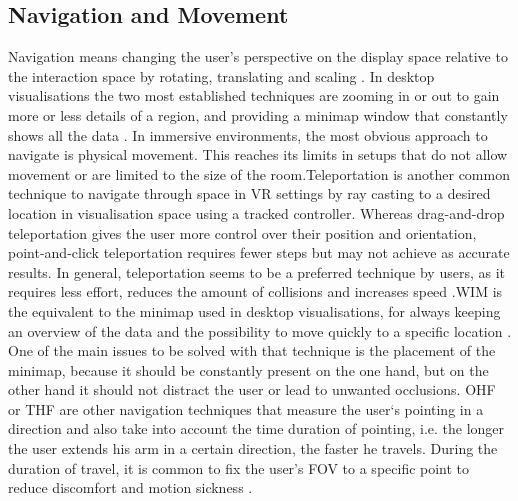 \subsection{Navigation and Movement}
\label{subsection:Navigation}
Navigation means changing the user's perspective on the display space relative to the interaction space by rotating, translating and scaling \autocite[48]{Cordeil2017}. In desktop visualisations the two most established techniques are zooming in or out to gain more or less details of a region, and providing a minimap window that constantly shows all the data \autocite[1214]{Yang2021}. In immersive environments, the most obvious approach to navigate is physical movement. This reaches its limits in setups that do not allow movement or are limited to the size of the room.\newline Teleportation is another common technique to navigate through space in \ac{VR} settings by ray casting to a desired location in visualisation space using a tracked controller. Whereas drag-and-drop teleportation gives the user more control over their position and orientation, point-and-click teleportation requires fewer steps but may not achieve as accurate results. In general, teleportation seems to be a preferred technique by users, as it requires less effort, reduces the amount of collisions and increases speed \autocite[2]{Drogemuller2020}.\newline\ac{WIM} is the equivalent to the minimap used in desktop visualisations, for always keeping an overview of the data and the possibility to move quickly to a specific location \autocite[1214]{Yang2021}. One of the main issues to be solved with that technique is the placement of the minimap, because it should be constantly present on the one hand, but on the other hand it should not distract the user or lead to unwanted occlusions. \newline
\ac{OHF} or \ac{THF} are other navigation techniques that measure the user`s pointing in a direction and also take into account the time duration of pointing, i.e. the longer the user extends his arm in a certain direction, the faster he travels. During the duration of travel, it is common to fix the user's \ac{FOV} to a specific point to reduce discomfort and motion sickness \autocite[2]{Drogemuller2020}.

